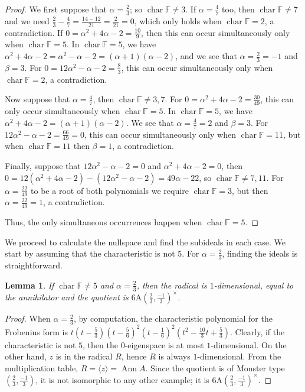 \documentclass[11pt, a4paper]{article}
\theoremstyle{plain}
\newtheorem{lemma}[theorem]{Lemma}
\theoremstyle{definition}
\newcommand\al{\alpha}
\newcommand\bt{\beta}
\newcommand\la{\langle}
\newcommand\ra{\rangle}
\DeclareMathOperator{\ch}{char}
\DeclareMathOperator{\Ann}{Ann}
\newcommand\FF{\mathbb{F}}
\newcommand{\A}{\mathrm{A}}
\newcommand{\0}{\overline{0}}
\newcommand{\2}{\overline{2}}
\newcommand{\1}{\mathbbm{1}}
\begin{document}
\begin{proof}
	We first suppose that $\al = \tfrac{2}{3}$; so $\ch \FF \neq 3$.  If $\al = \tfrac{4}{7}$ too, then $\ch \FF \neq 7$ and we need $\tfrac{2}{3}-\tfrac{4}{7} = \tfrac{14-12}{21} = \tfrac{2}{21} = 0$, which only holds when $\ch \FF = 2$, a contradiction. If $0 = \al^2 + 4\al - 2 = \tfrac{10}{9}$, then this can occur simultaneously only when $\ch \FF = 5$. In $\ch \FF = 5$, we have $\al^2 + 4\al - 2 = \al^2 - \al - 2 = (\al+1)(\al-2)$, and we see that $\al = \tfrac {2}{3} = -1$ and $\bt = 3$. For $0 = 12\al^2 - \al - 2 = \tfrac{8}{3}$, this can occur simultaneously only when $\ch \FF = 2$, a contradiction.

Now suppose that $\al = \tfrac{4}{7}$, then $\ch \FF \neq 3, 7$. For $0=\al^2 + 4\al- 2 = \tfrac{30}{49}$, this can only occur simultaneously when $\ch \FF = 5$. In $\ch \FF = 5$, we have $\al^2 + 4\al - 2 = (\al+1)(\al-2)$. We see that $\al= \tfrac{4}{7}=2$ and $\bt = 3$. For $12\al^2 -\al - 2 = \tfrac{66}{49} = 0$, this can occur simultaneously only when $\ch \FF = 11$,  but when $\ch \FF = 11$ then $\bt = 1$, a contradiction.
	
Finally, suppose that $12\al^2 -\al - 2 = 0$ and $\al^2 + 4\al - 2 =0$, then $0 = 12(\al^2 + 4\al - 2)-(12\al^2 -\al - 2) = 49 \al -22$, so $ \ch \FF \neq 7,11$. For $\al = \frac{22}{49}$ to be a root of both polynomials we require $\ch \FF = 3$, but then $\al = \tfrac{22}{49} =1$, a contradiction.

Thus, the only simultaneous occurrences happen when $\ch \FF = 5$.
\end{proof}



We proceed to calculate the nullspace and find the subideals in each case.  We start by assuming that the characteristic is not $5$.  For $\al = \frac{2}{3}$, finding the ideals is straightforward.

\begin{lemma}\label{6Aideal 2/3}
If $\ch \FF \neq 5$ and $\al = \frac{2}{3}$, then the radical is $1$-dimensional, equal to the annihilator and the quotient is $6\A(\frac{2}{3}, \frac{-1}{3})^\times$.
\end{lemma}

\begin{proof}
When $\al = \tfrac{2}{3}$, by computation, the characteristic polynomial for the Frobenius form is $t(t-\frac{5}{3})(t - \frac{5}{6})^2(t - \frac{1}{6})^2(t^2 - \frac{10}{3}t + \frac{5}{3})$.  Clearly, if the characteristic is not $5$, then the $0$-eigenspace is at most $1$-dimensional.  On the other hand, $z$ is in the radical $R$, hence $R$ is always $1$-dimensional.  From the multiplication table, $R = \la z \ra = \Ann A$.  Since the quotient is of Monster type $(\tfrac{2}{3}, \tfrac{-1}{3})$, it is not isomorphic to any other example; it is $6\A(\frac{2}{3}, \frac{-1}{3} )^\times$.
\end{proof}
\end{document}
